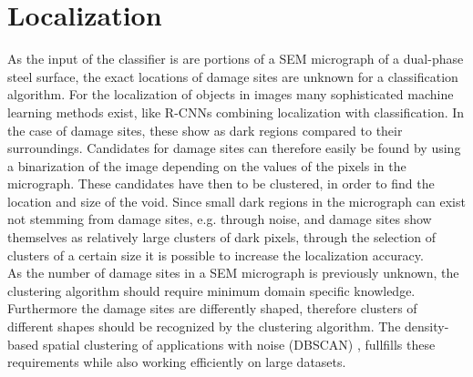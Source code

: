 




\section{Localization}

As the input of the classifier is are portions of a SEM micrograph of a dual-phase steel surface, the exact locations of damage sites are unknown for a classification algorithm. For the localization of objects in images many sophisticated machine learning methods exist, like R-CNNs combining localization with classification. In the case of damage sites, these show as dark regions compared to their surroundings. Candidates for damage sites can therefore easily be found by using a binarization of the image depending on the values of the pixels in the micrograph. These candidates have then to be clustered, in order to find the location and size of the void. Since small dark regions in the micrograph can exist not stemming from damage sites, e.g. through noise, and damage sites show themselves as relatively large clusters of dark pixels, through the selection of clusters of a certain size it is possible to increase the localization accuracy.\\

As the number of damage sites in a SEM micrograph is previously unknown, the clustering algorithm should require minimum domain specific knowledge. Furthermore the damage sites are differently shaped, therefore clusters of different shapes should be recognized by the clustering algorithm. The density-based spatial clustering of applications with noise (DBSCAN) \cite{Ester:1996:DAD:3001460.3001507}, fullfills these requirements while also working efficiently on large datasets. 

